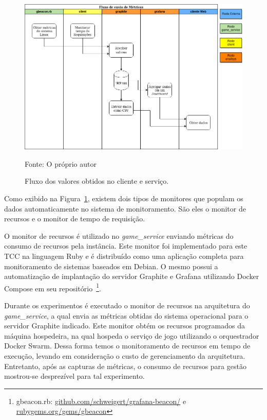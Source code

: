 \begin{figure}[htb!]
    \caption{Fluxo dos valores obtidos no cliente e serviço.}
    \label{fig:fluxo_data}
    \includegraphics[width=\textwidth]{img/cap5/fluxo_metricas.png}
    \centering
    
    Fonte: O próprio autor
\end{figure}

Como exibido na Figura~\ref{fig:fluxo_data}, existem dois tipos de monitores que populam os dados automaticamente no sistema de monitoramento.
%
São eles o monitor de recursos e  o monitor de tempo de requisição. 

O monitor de recursos é utilizado no \textit{game\_service} enviando métricas do consumo de recursos pela instância.
%
Este monitor foi implementado para este TCC na linguagem Ruby e é distribuído como uma aplicação completa para monitoramento de sistemas baseados em Debian.
%
O mesmo possui a automatização de implantação do servidor Graphite e Grafana utilizando Docker Compose em seu repositório~\footnote{gbeacon.rb: \url{github.com/schweigert/grafana-beacon/} e \url{rubygems.org/gems/gbeacon}}.

Durante os experimentos é executado o monitor de recursos na arquitetura do \textit{game\_service}, a qual envia as métricas obtidas do sistema operacional para o servidor Graphite indicado.
%
Este monitor obtém os recursos programados da máquina hospedeira, na qual hospeda o serviço de jogo utilizando o orquestrador Docker Swarm.
%
Dessa forma temos o monitoramento de recursos em tempo de execução, levando em consideração o custo de gerenciamento da arquitetura.
%
Entretanto, após as capturas de métricas, o consumo de recursos para gestão mostrou-se desprezível para tal experimento.

